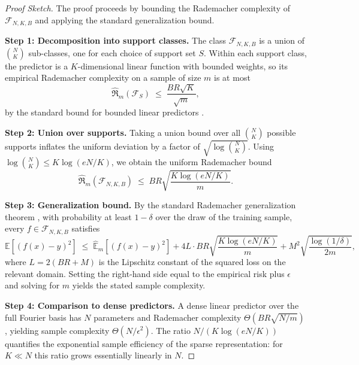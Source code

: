 \documentclass[11pt]{article}
\begin{document}
\begin{proof}[Proof Sketch]
The proof proceeds by bounding the Rademacher complexity of
$\mathcal{F}_{N,K,B}$ and applying the standard generalization bound.

\textbf{Step 1: Decomposition into support classes.}
The class $\mathcal{F}_{N,K,B}$ is a union of $\binom{N}{K}$ sub-classes, one
for each choice of support set $S$. Within each support class, the predictor
is a $K$-dimensional linear function with bounded weights, so its empirical
Rademacher complexity on a sample of size $m$ is at most
\begin{equation}
\widehat{\mathfrak{R}}_m(\mathcal{F}_S) \;\leq\; \frac{B R \sqrt{K}}{\sqrt{m}},
\end{equation}
by the standard bound for bounded linear predictors \cite{bartlett2002}.

\textbf{Step 2: Union over supports.}
Taking a union bound over all $\binom{N}{K}$ possible supports inflates the
uniform deviation by a factor of $\sqrt{\log \binom{N}{K}}$. Using
$\log \binom{N}{K} \leq K \log(eN/K)$, we obtain the uniform Rademacher
bound
\begin{equation}
\widehat{\mathfrak{R}}_m(\mathcal{F}_{N,K,B}) \;\leq\; B R \sqrt{\frac{K \log(eN/K)}{m}}.
\end{equation}

\textbf{Step 3: Generalization bound.}
By the standard Rademacher generalization theorem \cite{bartlett2002}, with
probability at least $1 - \delta$ over the draw of the training sample,
every $f \in \mathcal{F}_{N,K,B}$ satisfies
\begin{equation}
\mathbb{E}[(f(x) - y)^2] \;\leq\; \widehat{\mathbb{E}}_m[(f(x) - y)^2]
+ 4 L \cdot B R \sqrt{\frac{K \log(eN/K)}{m}}
+ M^2 \sqrt{\frac{\log(1/\delta)}{2m}},
\end{equation}
where $L = 2(BR + M)$ is the Lipschitz constant of the squared loss on the
relevant domain. Setting the right-hand side equal to the empirical risk
plus $\epsilon$ and solving for $m$ yields the stated sample complexity.

\textbf{Step 4: Comparison to dense predictors.}
A dense linear predictor over the full Fourier basis has $N$ parameters and
Rademacher complexity $\Theta(BR\sqrt{N/m})$, yielding sample complexity
$\Theta(N/\epsilon^2)$. The ratio
$N / (K \log(eN/K))$ quantifies the exponential sample efficiency of the
sparse representation: for $K \ll N$ this ratio grows essentially linearly
in $N$.
\end{proof}
\end{document}
